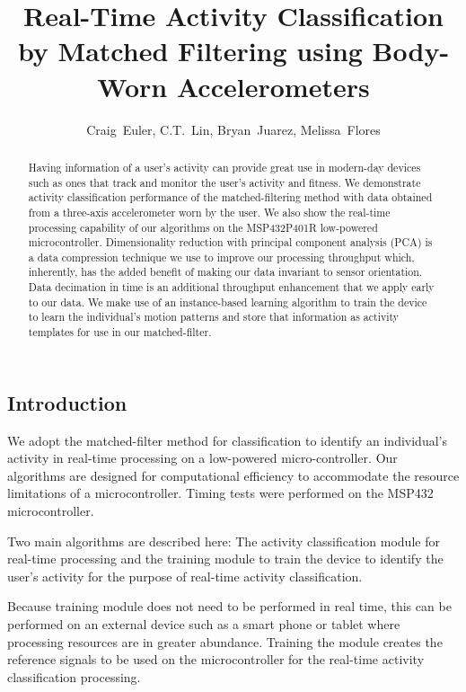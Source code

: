\documentclass{sciposter}
\title{Real-Time Activity Classification by Matched Filtering using Body-Worn Accelerometers}
\author{Craig~Euler, C.T.~Lin, Bryan~Juarez, Melissa~Flores}
\institute 
{College of Engineering and Computer Science\\
California State University Northridge}
\begin{document}

\maketitle

\begin{multicols}{3}

\begin{abstract}
Having information of a user's activity can provide great use in modern-day devices such as ones that track and monitor the user's activity and fitness.
We demonstrate activity classification performance of the matched-filtering method with data obtained from a three-axis accelerometer worn by the user.
We also show the real-time processing capability of our algorithms on the MSP432P401R low-powered microcontroller.
Dimensionality reduction with principal component analysis (PCA) \cite{bishop_2006} is a data compression technique we use to improve our processing throughput which, inherently, has the added benefit of making     our data invariant to sensor orientation.
Data decimation in time is an additional throughput enhancement that we apply early to our data.
We make use of an instance-based learning algorithm to train the device to learn the individual's motion patterns and store that information as activity templates for use in our matched-filter.
\end{abstract}

\section{Introduction}
We adopt the matched-filter method for classification to identify an individual's activity in real-time processing on a low-powered micro-controller.
Our algorithms are designed for computational efficiency to accommodate the resource limitations of a microcontroller.
Timing tests were performed on the MSP432 microcontroller.

Two main algorithms are described here: The activity classification module for real-time processing and the training module to train the device to identify the user's activity for the purpose of real-time activity classification.

Because training module does not need to be performed in real time, this can be performed on an external device such as a smart phone or tablet where processing resources are in greater abundance.
Training the module creates the reference signals to be used on the microcontroller for the real-time activity classification processing.


\end{multicols}
\end{document}
